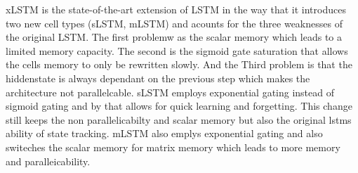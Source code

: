 %
xLSTM is the state-of-the-art extension of LSTM \parencite{beck2024xlstm} in the way that it introduces two new cell types (sLSTM, mLSTM) and acounts for the three weaknesses of the original LSTM. The first problemw as the scalar memory which leads to a limited memory capacity. The second is the sigmoid gate saturation that allows the cells memory to only be rewritten slowly. And the Third problem is that the hiddenstate is always dependant on the previous step which makes the architecture not parallelcable. sLSTM employs exponential gating instead of sigmoid gating and by that allows for quick learning and forgetting. This change still keeps the non parallelicabilty and scalar memory but also the original lstms ability of state tracking. mLSTM also emplys exponential gating and also switeches the scalar memory for matrix memory which leads to more memory and paralleicability. 


